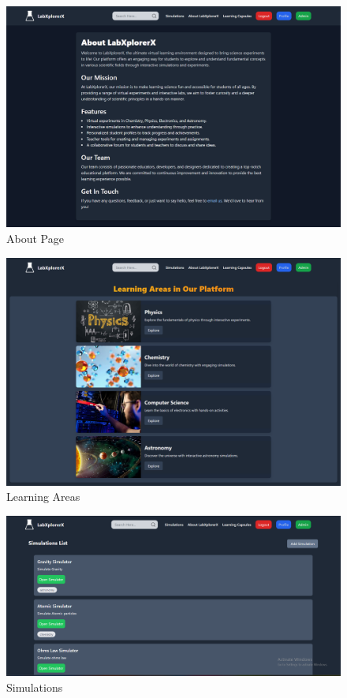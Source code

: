  \begin{figure}[H]
    \centering
     \includegraphics[width = 16cm]{Diagrams/output/about.png}
     \caption{About Page}
 \end{figure}

 \begin{figure}[H]
    \centering
     \includegraphics[width = 16cm]{Diagrams/output/learningareas.png}
     \caption{Learning Areas}
 \end{figure}


 \begin{figure}[H]
    \centering
     \includegraphics[width = 16cm]{Diagrams/output/simulations.png}
     \caption{Simulations}
 \end{figure}

